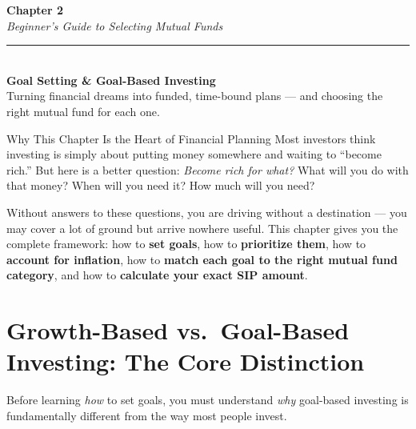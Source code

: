 \documentclass[12pt,a4paper]{article}
\begin{document}
\begin{tcolorbox}[
  enhanced, arc=6pt, boxrule=0pt,
  colback=PrimaryBlue, colframe=PrimaryBlue,
  left=14pt, right=14pt, top=14pt, bottom=14pt
]
  {\color{white}\Huge\bfseries Chapter 2}\\[4pt]
  {\color{white!80!PrimaryBlue}\Large\itshape
   Beginner's Guide to Selecting Mutual Funds}\\[10pt]
  {\color{white}\rule{\linewidth}{0.6pt}}\\[8pt]
  {\color{white}\LARGE\bfseries
   Goal Setting \& Goal-Based Investing}\\[6pt]
  {\color{white!75!PrimaryBlue}\normalsize
   Turning financial dreams into funded, time-bound plans ---
   and choosing the right mutual fund for each one.}
\end{tcolorbox}

\vspace{4mm}

\begin{conceptbox}{Why This Chapter Is the Heart of Financial Planning}
Most investors think investing is simply about putting money somewhere and waiting to ``become rich.'' But here is a better question: \textit{Become rich for what?} What will you do with that money? When will you need it? How much will you need?

Without answers to these questions, you are driving without a destination --- you may cover a lot of ground but arrive nowhere useful. This chapter gives you the complete framework: how to \textbf{set goals}, how to \textbf{prioritize them}, how to \textbf{account for inflation}, how to \textbf{match each goal to the right mutual fund category}, and how to \textbf{calculate your exact SIP amount}.
\end{conceptbox}

\vspace{2mm}

\section{Growth-Based vs.\ Goal-Based Investing: The Core Distinction}

Before learning \textit{how} to set goals, you must understand \textit{why} goal-based investing is fundamentally different from the way most people invest.
\end{document}

